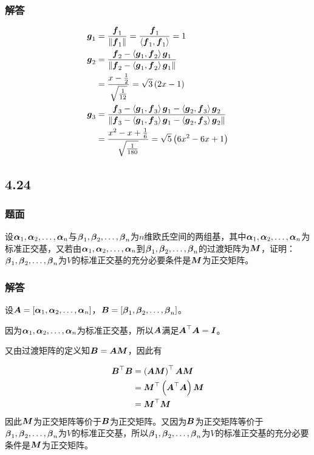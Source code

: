 \documentclass{beamer}
\begin{document}
\begin{frame}
    \frametitle{解答}
    \begin{align*}
        \vecg_1 & =\frac{\vecf_1}{\Abs{\vecf_1}}=\frac{\vecf_1}{\indot{\vecf_1}{\vecf_1}}=1                                                                                      \\
        \vecg_2 & =\frac{\vecf_2-\indot{\vecg_1}{\vecf_2}\vecg_1}{\Abs{\vecf_2-\indot{\vecg_1}{\vecf_2}\vecg_1}}                                                                 \\
                & =\frac{x-\frac{1}{2}}{\sqrt{\frac{1}{12}}}=\sqrt3\mypar{2x-1}                                                                                                  \\
        \vecg_3 & =\frac{\vecf_3-\indot{\vecg_1}{\vecf_3}\vecg_1-\indot{\vecg_2}{\vecf_3}\vecg_2}{\Abs{\vecf_3-\indot{\vecg_1}{\vecf_3}\vecg_1-\indot{\vecg_2}{\vecf_3}\vecg_2}} \\
                & =\frac{x^2-x+\frac{1}{6}}{\sqrt{\frac{1}{180}}}=\sqrt5\mypar{6x^2-6x+1}
    \end{align*}
\end{frame}

\subsection*{4.24}
\begin{frame}
    \frametitle{题面}
    设\(\enums{\vecal}{n}\)与\(\enums{\vecbeta}{n}\)为\(n\)维欧氏空间的两组基，其中\(\enums{\vecal}{n}\)为标准正交基，又若由\(\enums{\vecal}{n}\)到\(\enums{\vecbeta}{n}\)的过渡矩阵为\(\matm\)，证明：\(\enums{\vecbeta}{n}\)为\(V\)的标准正交基的充分必要条件是\(\matm\)为正交矩阵。
\end{frame}

\begin{frame}
    \frametitle{解答}
    设\(\mata=\mat{\enums{\vecal}{n}}\)，\(\matb=\mat{\enums{\vecbeta}{n}}\)。

    因为\(\enums{\vecal}{n}\)为标准正交基，所以\(\mata\)满足\(\mata^\top\mata=\mati\)。

    又由过渡矩阵的定义知\(\matb=\mata\matm\)，因此有

    \begin{align*}
        \matb^\top\matb & =\mypar{\mata\matm}^\top\mata\matm      \\
                        & =\matm^\top\mypar{\mata^\top\mata}\matm \\
                        & =\matm^\top\matm
    \end{align*}
    因此\(\matm\)为正交矩阵等价于\(\matb\)为正交矩阵。又因为\(\matb\)为正交矩阵等价于\(\enums{\vecbeta}{n}\)为\(V\)的标准正交基，所以\(\enums{\vecbeta}{n}\)为\(V\)的标准正交基的充分必要条件是\(\matm\)为正交矩阵。
\end{frame}
\end{document}
